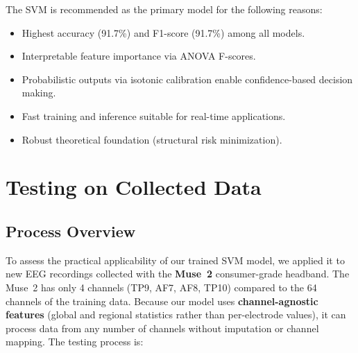 \documentclass[12pt,a4paper]{article}
\begin{document}
The SVM is recommended as the primary model for the following reasons:
\begin{itemize}
  \item Highest accuracy (91.7\%) and F1-score (91.7\%) among all models.
  \item Interpretable feature importance via ANOVA F-scores.
  \item Probabilistic outputs via isotonic calibration enable confidence-based decision making.
  \item Fast training and inference suitable for real-time applications.
  \item Robust theoretical foundation (structural risk minimization).
\end{itemize}

\section{Testing on Collected Data}
\label{sec:testing}

\subsection{Process Overview}

To assess the practical applicability of our trained SVM model, we applied it to new EEG recordings collected with the \textbf{Muse~2} consumer-grade headband. The Muse~2 has only 4 channels (TP9, AF7, AF8, TP10) compared to the 64 channels of the training data. Because our model uses \textbf{channel-agnostic features} (global and regional statistics rather than per-electrode values), it can process data from any number of channels without imputation or channel mapping. The testing process is:
\end{document}
